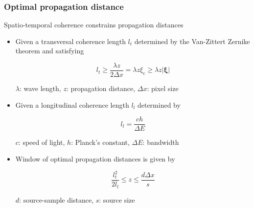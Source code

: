 \documentclass{beamer}
\renewcommand{\vec}{\mathbold}
\newcommand{\xic}{\xi_{\mathrm{c}}}
\newcommand{\abs}[1]{\left| #1 \right|} %
\begin{document}
\begin{frame}
\frametitle{Optimal propagation distance}

  Spatio-temporal coherence constrains propagation distances

  \begin{itemize}
  \item Given a transversal coherence length $l_t$ determined by the Van-Zittert
    Zernike theorem and satisfying

    \begin{equation*}
      l_t \ge \frac{\lambda z}{2 \Delta x} = \lambda z \xic \ge \lambda z \abs{\vec{\xi}}
    \end{equation*}
    
    $\lambda$: wave length, $z$: propagation distance, $\Delta x$: pixel size

  \item Given a longitudinal coherence length $l_l$ determined by

    \begin{equation*}
      l_l = \frac{c h}{\Delta E}
    \end{equation*}

    $c$: speed of light, $h$: Planck's constant, $\Delta E$: bandwidth

  \item Window of optimal propagation distances is given by

    \begin{equation*}
      \frac{l_t^2}{2 l_l} \le z \le \frac{d \Delta x}{s}
    \end{equation*}

    $d$: source-sample distance, $s$: source size

  \end{itemize}

\end{frame}
\end{document}
